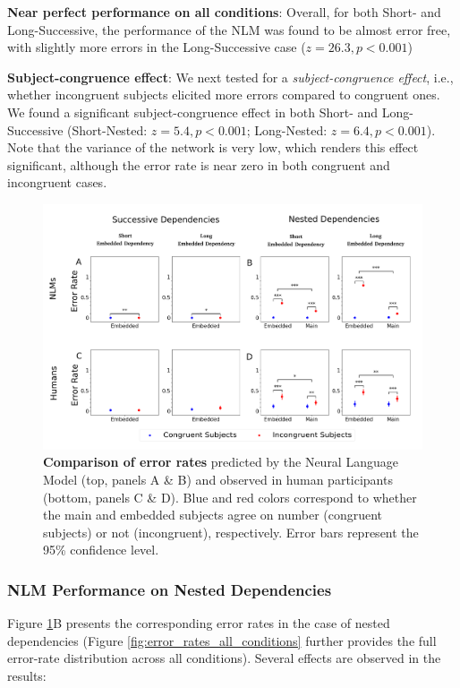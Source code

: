 \begin{APAitemize}
    \item \textbf{Near perfect performance on all conditions}: Overall, for both Short- and Long-Successive, the performance of the NLM was found to be almost error free, with slightly more errors in the Long-Successive case ($z=26.3, p<0.001$)
    \item \textbf{Subject-congruence effect}: We next tested for a \textit{subject-congruence effect}, i.e., whether incongruent subjects elicited more errors compared to congruent ones. We found a significant subject-congruence effect in both Short- and Long-Successive (Short-Nested: $z=5.4, p<0.001$; Long-Nested: $z=6.4, p<0.001$). Note that the variance of the network is very low, which renders this effect significant, although the error rate is near zero in both congruent and incongruent cases.
\end{APAitemize}
 
 \begin{figure}[ht]
    \centering
    \includegraphics[width=16cm]{figures/error_rates_plural_attractor.png}
    \caption{\textbf{Comparison of error rates} predicted by the Neural Language Model (top, panels A \& B) and observed in human participants (bottom, panels C \& D). Blue and red colors correspond to whether the main and embedded subjects agree on number (congruent subjects) or not (incongruent), respectively. Error bars represent the 95\% confidence level.}
    \label{fig:error_rates_plural_attractor}
\end{figure}


\subsubsection{NLM Performance on Nested Dependencies}
Figure \ref{fig:error_rates_plural_attractor}B presents the corresponding error rates in the case of nested dependencies (Figure \ref{fig:error_rates_all_conditions} further provides the full error-rate distribution across all conditions). Several effects are observed in the results:


